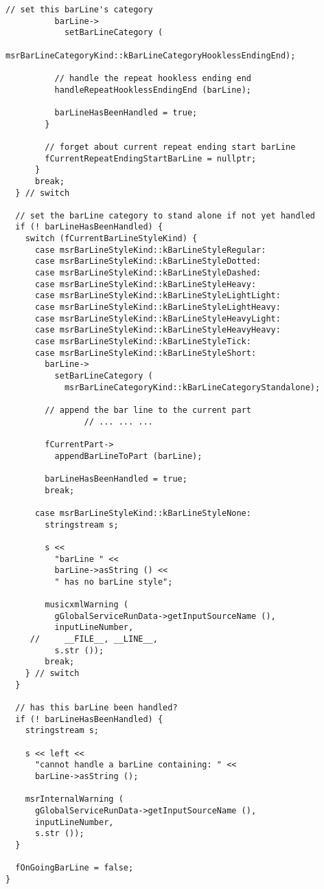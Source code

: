 \begin{lstlisting}[language=CPlusPlus]
          // set this barLine's category
          barLine->
            setBarLineCategory (
              msrBarLineCategoryKind::kBarLineCategoryHooklessEndingEnd);

          // handle the repeat hookless ending end
          handleRepeatHooklessEndingEnd (barLine);

          barLineHasBeenHandled = true;
        }

        // forget about current repeat ending start barLine
        fCurrentRepeatEndingStartBarLine = nullptr;
      }
      break;
  } // switch

  // set the barLine category to stand alone if not yet handled
  if (! barLineHasBeenHandled) {
    switch (fCurrentBarLineStyleKind) {
      case msrBarLineStyleKind::kBarLineStyleRegular:
      case msrBarLineStyleKind::kBarLineStyleDotted:
      case msrBarLineStyleKind::kBarLineStyleDashed:
      case msrBarLineStyleKind::kBarLineStyleHeavy:
      case msrBarLineStyleKind::kBarLineStyleLightLight:
      case msrBarLineStyleKind::kBarLineStyleLightHeavy:
      case msrBarLineStyleKind::kBarLineStyleHeavyLight:
      case msrBarLineStyleKind::kBarLineStyleHeavyHeavy:
      case msrBarLineStyleKind::kBarLineStyleTick:
      case msrBarLineStyleKind::kBarLineStyleShort:
        barLine->
          setBarLineCategory (
            msrBarLineCategoryKind::kBarLineCategoryStandalone);

        // append the bar line to the current part
				// ... ... ...

        fCurrentPart->
          appendBarLineToPart (barLine);

        barLineHasBeenHandled = true;
        break;

      case msrBarLineStyleKind::kBarLineStyleNone:
        stringstream s;

        s <<
          "barLine " <<
          barLine->asString () <<
          " has no barLine style";

        musicxmlWarning (
          gGlobalServiceRunData->getInputSourceName (),
          inputLineNumber,
     //     __FILE__, __LINE__,
          s.str ());
        break;
    } // switch
  }

  // has this barLine been handled?
  if (! barLineHasBeenHandled) {
    stringstream s;

    s << left <<
      "cannot handle a barLine containing: " <<
      barLine->asString ();

    msrInternalWarning (
      gGlobalServiceRunData->getInputSourceName (),
      inputLineNumber,
      s.str ());
  }

  fOnGoingBarLine = false;
}
\end{lstlisting}


